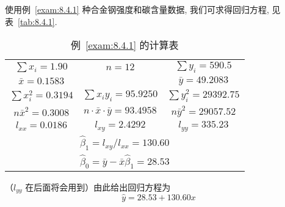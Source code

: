 \begin{example}\label{exam:8.4.2}
使用例~\ref{exam:8.4.1} 种合金钢强度和碳含量数据, 我们可求得回归方程, 见表~\ref{tab:8.4.1}.

\begin{table}[htbp]
  \centering
  \caption{例~\ref{exam:8.4.1} 的计算表\label{tab:8.4.2}}
  \begin{tabular}{ccc}
  \toprule
   $\sum x_i =1.90$          &     $n=12$                           & $\sum y_i = 590.5$       \\
   $\bar{x} = 0.1583$          &                                      & $\bar{y}  = 49.2083$       \\
   $\sum x_{i}^{2} = 0.3194$ & $ \sum x_iy_i=95.9250  $            & $\sum y_i^2 = 29392.75$  \\
   $ n \bar{x}^2 = 0.3008$     & $n\cdot\bar{x}\cdot\bar{y}=93.4958 $ & $n\bar{y}^2 = 29057.52$    \\
   $ l_{xx} = 0.0186$          & $l_{xy} = 2.4292$                    & $l_{yy}=335.23$            \\
   \midrule
   \multicolumn{3}{c}{ $\hat{\beta}_1 = l_{xy}/l_{xx} = 130.60$ }                                  \\
   \multicolumn{3}{c}{ $\hat{\beta}_0 = \bar{y} - \bar{x} \hat{\beta}_1=28.53$ }                   \\
   \bottomrule
  \end{tabular}%
\end{table}%

（$l_{yy}$ 在后面将会用到）由此给出回归方程为
\begin{equation*}
  \hat{y} = 28.53 + 130.60 x
\end{equation*}
\end{example}

